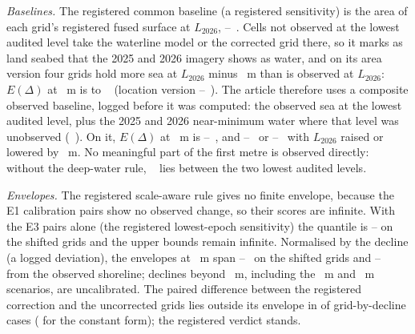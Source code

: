 \emph{Baselines.} The registered common baseline (a registered sensitivity) is the area of each grid's registered fused surface at $L_{2026}$, --~\kmsq{}. Cells not observed at the lowest audited level take the waterline model or the corrected grid there, so it marks as land seabed that the 2025 and 2026 imagery shows as water, and on its area version four grids hold more sea at $L_{2026}$ minus ~m than is observed at $L_{2026}$: $E(\Delta)$ at ~m is  to ~\kmsq{} (location version --~\kmsq{}). The article therefore uses a composite observed baseline, logged before it was computed: the observed sea at the lowest audited level, plus the 2025 and 2026 near-minimum water where that level was unobserved (~\kmsq{}). On it, $E(\Delta)$ at ~m is --~\kmsq{}, and --~\kmsq{} or --~\kmsq{} with $L_{2026}$ raised or lowered by ~m. No meaningful part of the first metre is observed directly: without the deep-water rule, ~\kmsq{} lies between the two lowest audited levels.

\emph{Envelopes.} The registered scale-aware rule gives no finite envelope, because the E1 calibration pairs show no observed change, so their scores are infinite. With the E3 pairs alone (the registered lowest-epoch sensitivity) the quantile is -- on the shifted grids and the upper bounds remain infinite. Normalised by the decline (a logged deviation), the envelopes at ~m span --~\kmsq{} on the shifted grids and --~\kmsq{} from the observed shoreline; declines beyond ~m, including the ~m and ~m scenarios, are uncalibrated. The paired difference between the registered correction and the uncorrected grids lies outside its envelope in  of  grid-by-decline cases ( for the constant form); the registered verdict stands.

